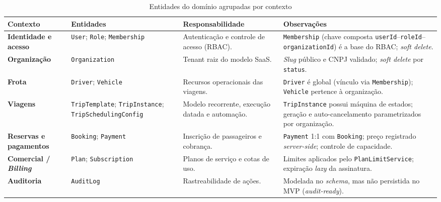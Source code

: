 {\footnotesize
\begin{table}[H]
\centering
\caption{Entidades do domínio agrupadas por contexto}
\label{tab:entidades}
\setlength{\tabcolsep}{4pt}
\begin{tabularx}{\textwidth}{@{}>{\bfseries}p{2.35cm} >{\raggedright\arraybackslash}p{3.4cm} >{\raggedright\arraybackslash}p{4.0cm} Y@{}}
\toprule
\textbf{Contexto} & \textbf{Entidades} & \textbf{Responsabilidade} & \textbf{Observações} \\
\midrule
Identidade e acesso & \texttt{User}; \texttt{Role}; \texttt{Membership} & Autenticação e controle de acesso (RBAC). & \texttt{Membership} (chave composta \texttt{userId}--\texttt{roleId}--\texttt{organizationId}) é a base do RBAC; \textit{soft delete}. \\
\addlinespace
Organização & \texttt{Organization} & Tenant raiz do modelo SaaS. & \textit{Slug} público e CNPJ validado; \textit{soft delete} por \texttt{status}. \\
\addlinespace
Frota & \texttt{Driver}; \texttt{Vehicle} & Recursos operacionais das viagens. & \texttt{Driver} é global (vínculo via \texttt{Membership}); \texttt{Vehicle} pertence à organização. \\
\addlinespace
Viagens & \texttt{TripTemplate}; \texttt{TripInstance}; \texttt{TripScheduling}\newline\texttt{Config} & Modelo recorrente, execução datada e automação. & \texttt{TripInstance} possui máquina de estados; geração e auto-cancelamento parametrizados por organização. \\
\addlinespace
Reservas e pagamentos & \texttt{Booking}; \texttt{Payment} & Inscrição de passageiros e cobrança. & \texttt{Payment} 1:1 com \texttt{Booking}; preço registrado \textit{server-side}; controle de capacidade. \\
\addlinespace
Comercial / \textit{Billing} & \texttt{Plan}; \texttt{Subscription} & Planos de serviço e cotas de uso. & Limites aplicados pelo \texttt{PlanLimitService}; expiração \textit{lazy} da assinatura. \\
\addlinespace
Auditoria & \texttt{AuditLog} & Rastreabilidade de ações. & Modelada no \textit{schema}, mas não persistida no MVP (\textit{audit-ready}). \\
\bottomrule
\end{tabularx}
\end{table}
}
